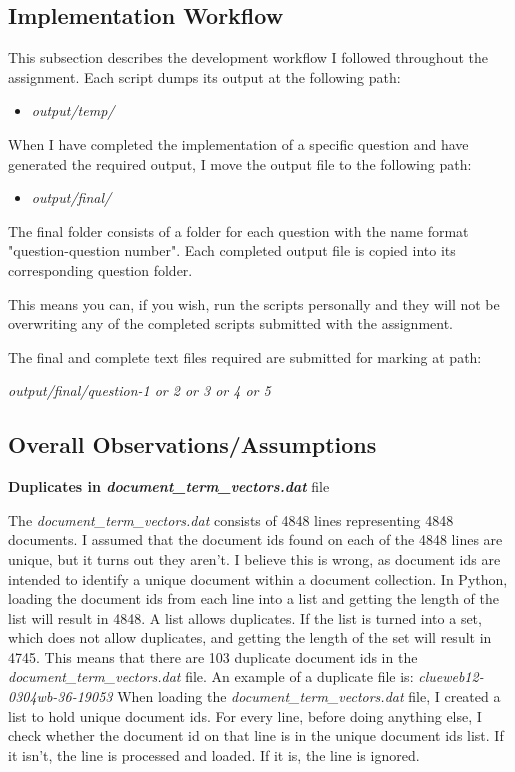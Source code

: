\documentclass{article} %
\begin{document}
\subsection*{Implementation Workflow}

This subsection describes the development workflow I followed throughout the assignment. Each script dumps its output at the following path:

\begin{itemize}
    \item \textit{output/temp/}
\end{itemize}

When I have completed the implementation of a specific question and have generated the required output, I move the output file to the following path:

\begin{itemize}
    \item \textit{output/final/}
\end{itemize}

The final folder consists of a folder for each question with the name format "question-question number". Each completed output file is copied into its corresponding question folder.

This means you can, if you wish, run the scripts personally and they will not be overwriting any of the completed scripts submitted with the assignment.

The final and complete text files required are submitted for marking at path:

\textit{output/final/question-1 or 2 or 3 or 4 or 5}

\subsection*{Overall Observations/Assumptions}

\textbf{Duplicates in \textit{document\_term\_vectors.dat}} file

The \textit{document\_term\_vectors.dat} consists of 4848 lines representing 4848 documents. I assumed that the document ids found on each of the 4848 lines are unique, but it turns out they aren't. I believe this is wrong, as document ids are intended to identify a unique document within a document collection. In Python, loading the document ids from each line into a list and getting the length of the list will result in 4848. A list allows duplicates. If the list is turned into a set, which does not allow duplicates, and getting the length of the set will result in 4745. This means that there are 103 duplicate document ids in the \textit{document\_term\_vectors.dat} file. An example of a duplicate file is: \textit{clueweb12-0304wb-36-19053}
When loading the \textit{document\_term\_vectors.dat} file, I created a list to hold unique document ids. For every line, before doing anything else, I check whether the document id on that line is in the unique document ids list. If it isn't, the line is processed and loaded. If it is, the line is ignored.
\end{document}

